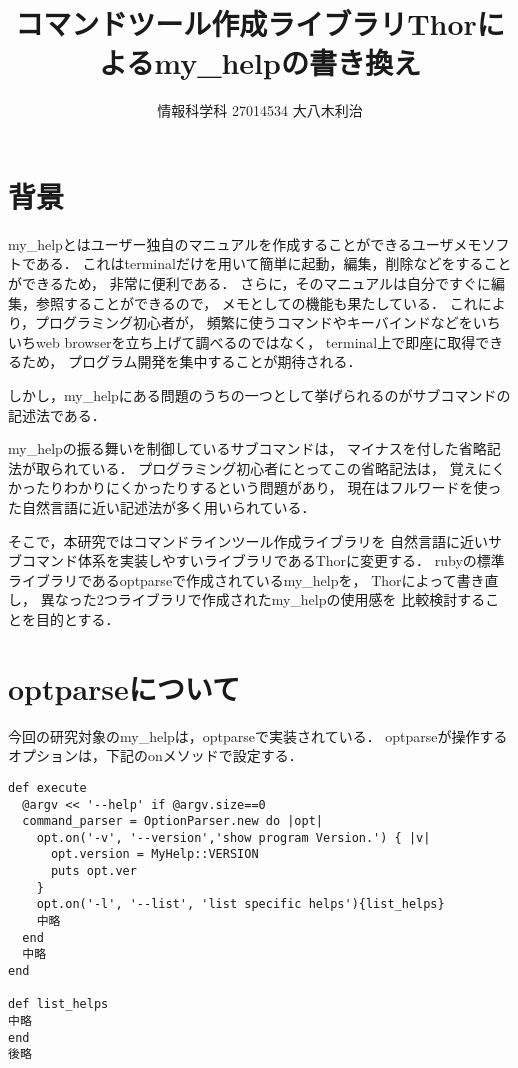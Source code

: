 \documentclass[a4j,twocolumn]{jsarticle}
\begin{document}
\title{コマンドツール作成ライブラリThorによるmy\_helpの書き換え}
\author{情報科学科 \hspace{5mm} 27014534 \hspace{5mm} 大八木利治}
\date{}
\maketitle
\section{背景}
my\_helpとはユーザー独自のマニュアルを作成することができるユーザメモソフトである．
これはterminalだけを用いて簡単に起動，編集，削除などをすることができるため，
非常に便利である．
さらに，そのマニュアルは自分ですぐに編集，参照することができるので，
メモとしての機能も果たしている．
これにより，プログラミング初心者が，
頻繁に使うコマンドやキーバインドなどをいちいちweb browserを立ち上げて調べるのではなく，
terminal上で即座に取得できるため，
プログラム開発を集中することが期待される．

しかし，my\_helpにある問題のうちの一つとして挙げられるのがサブコマンドの記述法である．

my\_helpの振る舞いを制御しているサブコマンドは，
マイナスを付した省略記法が取られている．
プログラミング初心者にとってこの省略記法は，
覚えにくかったりわかりにくかったりするという問題があり，
現在はフルワードを使った自然言語に近い記述法が多く用いられている．

そこで，本研究ではコマンドラインツール作成ライブラリを
自然言語に近いサブコマンド体系を実装しやすいライブラリであるThorに変更する．
rubyの標準ライブラリであるoptparseで作成されているmy\_helpを，
Thor\cite{erikhuda}によって書き直し，
異なった2つライブラリで作成されたmy\_helpの使用感を
比較検討することを目的とする．

\section{optparseについて}
今回の研究対象のmy\_helpは，optparseで実装されている．
optparseが操作するオプションは，下記のonメソッドで設定する．

\begin{lstlisting}[style=customRuby,basicstyle={\scriptsize\ttfamily}]
def execute
  @argv << '--help' if @argv.size==0
  command_parser = OptionParser.new do |opt|
    opt.on('-v', '--version','show program Version.') { |v|
      opt.version = MyHelp::VERSION
      puts opt.ver
    }
    opt.on('-l', '--list', 'list specific helps'){list_helps}
    中略
  end
  中略
end

def list_helps
中略
end
後略
\end{lstlisting}
\end{document}
